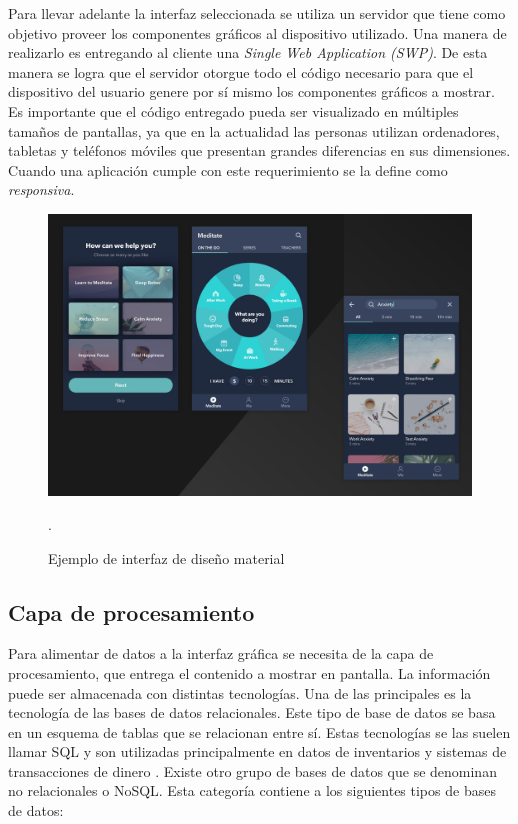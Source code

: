 Para llevar adelante la interfaz seleccionada se utiliza un servidor que tiene como objetivo proveer los componentes gráficos al dispositivo utilizado.
Una manera de realizarlo es entregando al cliente una \emph{Single Web Application (SWP)}.
De esta manera se logra que el servidor otorgue todo el código necesario para que el dispositivo del usuario genere por sí mismo los componentes gráficos a mostrar.
Es importante que el código entregado pueda ser visualizado en múltiples tamaños de pantallas, ya que en la actualidad las personas utilizan ordenadores, tabletas y teléfonos móviles que presentan grandes diferencias en sus dimensiones.
Cuando una aplicación cumple con este requerimiento se la define como \emph{responsiva}.

\begin{figure}[h]
	\centering
	\includegraphics[width=\textwidth]{./Figures/ch1MaterialDesign.jpg}
	\caption{Ejemplo de interfaz de diseño material \citep{WEBSITE:Material}}.
	\label{fig:ch1MaterialDesign}
\end{figure}

\newpage

\subsection{Capa de procesamiento}
Para alimentar de datos a la interfaz gráfica se necesita de la capa de procesamiento, que entrega el contenido a mostrar en pantalla. La información puede ser almacenada con distintas tecnologías.
Una de las principales es la tecnología de las bases de datos relacionales.
Este tipo de base de datos se basa en un esquema de tablas que se relacionan entre sí.
Estas tecnologías se las suelen llamar SQL y son utilizadas principalmente en datos de inventarios y sistemas de transacciones de dinero \citep{munar2014big}.
Existe otro grupo de bases de datos que se denominan no relacionales o NoSQL.
Esta categoría contiene a los siguientes tipos de bases de datos:

